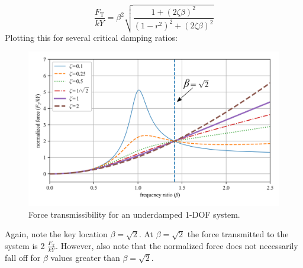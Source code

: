\documentclass[12pt,letter]{article}
\numberwithin{ex}{section} %
\numberwithin{re}{section} %
\begin{document}
				\begin{equation}
					\frac{F_\text{T}}{kY} = \beta^2 \sqrt{\frac{1+(2 \zeta \beta)^2}{(1-r^2)^2 + (2 \zeta \beta )^2}} 
				\end{equation}
				Plotting this for several critical damping ratios:
				\begin{figure}[H]
					\centering
					\includegraphics[]{../figures/base_excitation_force_transmissibility.png}
					\caption{Force transmissibility for an underdamped 1-DOF system.}
				\end{figure}
				Again, note the key location $\beta=\sqrt{2}$. At $\beta=\sqrt{2}$ the force transmitted to the system is 2 $\frac{F_\text{T}}{kY}$. However, also note that the normalized force does not necessarily fall off for $\beta$ values greater than $\beta=\sqrt{2}$.  
	
\end{document}
